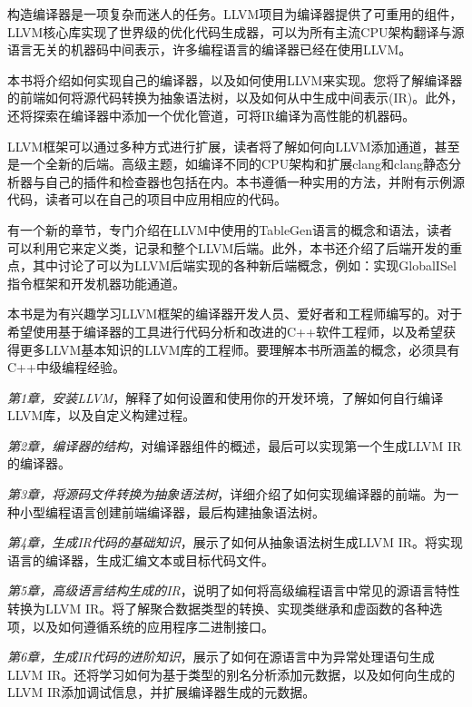 构造编译器是一项复杂而迷人的任务。LLVM项目为编译器提供了可重用的组件，LLVM核心库实现了世界级的优化代码生成器，可以为所有主流CPU架构翻译与源语言无关的机器码中间表示，许多编程语言的编译器已经在使用LLVM。

本书将介绍如何实现自己的编译器，以及如何使用LLVM来实现。您将了解编译器的前端如何将源代码转换为抽象语法树，以及如何从中生成中间表示(IR)。此外，还将探索在编译器中添加一个优化管道，可将IR编译为高性能的机器码。

LLVM框架可以通过多种方式进行扩展，读者将了解如何向LLVM添加通道，甚至是一个全新的后端。高级主题，如编译不同的CPU架构和扩展clang和clang静态分析器与自己的插件和检查器也包括在内。本书遵循一种实用的方法，并附有示例源代码，读者可以在自己的项目中应用相应的代码。


有一个新的章节，专门介绍在LLVM中使用的TableGen语言的概念和语法，读者可以利用它来定义类，记录和整个LLVM后端。此外，本书还介绍了后端开发的重点，其中讨论了可以为LLVM后端实现的各种新后端概念，例如：实现GlobalISel指令框架和开发机器功能通道。


本书是为有兴趣学习LLVM框架的编译器开发人员、爱好者和工程师编写的。对于希望使用基于编译器的工具进行代码分析和改进的C++软件工程师，以及希望获得更多LLVM基本知识的LLVM库的工程师。要理解本书所涵盖的概念，必须具有C++中级编程经验。


\textit{第1章，安装LLVM}，解释了如何设置和使用你的开发环境，了解如何自行编译LLVM库，以及自定义构建过程。

\textit{第2章，编译器的结构}，对编译器组件的概述，最后可以实现第一个生成LLVM IR的编译器。

\textit{第3章，将源码文件转换为抽象语法树}，详细介绍了如何实现编译器的前端。为一种小型编程语言创建前端编译器，最后构建抽象语法树。

\textit{第4章，生成IR代码的基础知识}，展示了如何从抽象语法树生成LLVM IR。将实现语言的编译器，生成汇编文本或目标代码文件。

\textit{第5章，高级语言结构生成的IR}，说明了如何将高级编程语言中常见的源语言特性转换为LLVM IR。将了解聚合数据类型的转换、实现类继承和虚函数的各种选项，以及如何遵循系统的应用程序二进制接口。

\textit{第6章，生成IR代码的进阶知识}，展示了如何在源语言中为异常处理语句生成LLVM IR。还将学习如何为基于类型的别名分析添加元数据，以及如何向生成的LLVM IR添加调试信息，并扩展编译器生成的元数据。

